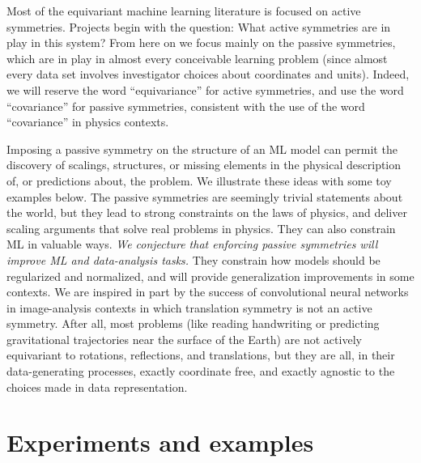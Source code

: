 \documentclass[preprint]{article} %
\begin{document}
Most of the equivariant machine learning literature is focused on active symmetries.
Projects begin with the question: What active symmetries are in play in this system?
From here on we focus mainly on the passive symmetries, which are in play in almost every conceivable learning problem (since almost every data set involves investigator choices about coordinates and units).
Indeed, we will reserve the word ``equivariance'' for active symmetries, and use the word ``covariance'' for passive symmetries, consistent with the use of the word ``covariance'' in physics contexts.

Imposing a passive symmetry on the structure of an ML model can permit the discovery of scalings, structures, or missing elements in the physical description of, or predictions about, the problem.
We illustrate these ideas with some toy examples below.
The passive symmetries are seemingly trivial statements about the world, but they lead to strong constraints on the laws of physics, and deliver scaling arguments that solve real problems in physics.
They can also constrain ML in valuable ways.
\emph{We conjecture that enforcing passive symmetries will improve ML and data-analysis tasks.}
They constrain how models should be regularized and normalized, and will provide generalization improvements in some contexts.
We are inspired in part by the success of convolutional neural networks in image-analysis contexts in which translation symmetry is not an active symmetry.
After all, most problems (like reading handwriting or predicting gravitational trajectories near the surface of the Earth) are not actively equivariant to rotations, reflections, and translations, but they are all, in their data-generating processes, exactly coordinate free, and exactly agnostic to the choices made in data representation.

\section{Experiments and examples}\label{sec:experiments}
\end{document}

